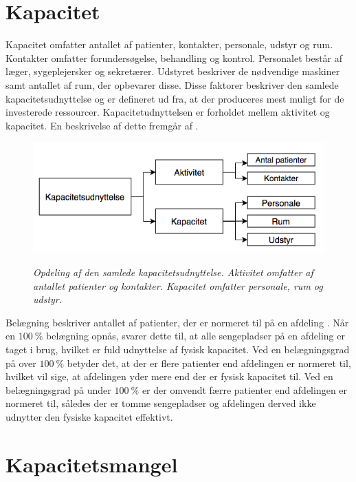 \section{Kapacitet} \label{kap}
Kapacitet omfatter antallet af patienter, kontakter, personale, udstyr og rum. Kontakter omfatter forundersøgelse, behandling og kontrol. Personalet består af læger, sygeplejersker og sekretærer. Udstyret beskriver de nødvendige maskiner samt antallet af rum, der opbevarer disse. Disse faktorer beskriver den samlede kapacitetsudnyttelse og er defineret ud fra, at der produceres mest muligt for de investerede ressourcer. Kapacitetudnyttelsen er forholdet mellem aktivitet og kapacitet. \cite{Company2013} En beskrivelse af dette fremgår af . 

\begin{figure}[H]
	\flushleft 
	\centering
	\includegraphics[scale=.45]{figures/Kapacitetsudnyttelse.png}
	\label{kapacitet}
	\flushleft
	\caption{\textit{Opdeling af den samlede kapacitetsudnyttelse. Aktivitet omfatter af antallet patienter og kontakter. Kapacitet omfatter personale, rum og udstyr. \cite{Company2013}}}
\end{figure}

\noindent
Belægning beskriver antallet af patienter, der er normeret til på en afdeling \cite{Heidmann2014}. Når en $100~\%$ belægning opnås, svarer dette til, at alle sengepladser på en afdeling er taget i brug, hvilket er fuld udnyttelse af fysisk kapacitet. Ved en belægningsgrad på over $100~\%$ betyder det, at der er flere patienter end afdelingen er normeret til, hvilket vil sige, at afdelingen yder mere end der er fysisk kapacitet til. Ved en belægningsgrad på under $100~\%$ er der omvendt færre patienter end afdelingen er normeret til, således der er tomme sengepladser og afdelingen derved ikke udnytter den fysiske kapacitet effektivt. \cite{Pauly1986} 

\section{Kapacitetsmangel}






